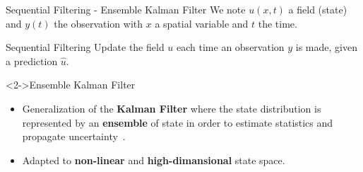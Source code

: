 \documentclass[aspectratio=169]{beamer} %
\begin{document}
\begin{frame}{Sequential Filtering - Ensemble Kalman Filter}
    \small
    We note $u(x, t)$ a field (state) and $y(t)$ the observation with $x$ a spatial variable and $t$ the time.
    \begin{block}{Sequential Filtering}
        Update the field $u$ each time an observation $y$ is made, given a prediction $\hat u$.
    \end{block}
    \vfill
    \begin{block}<2->{Ensemble Kalman Filter}
        \begin{itemize}
            \item Generalization of the \textbf{Kalman Filter} where the state distribution is represented by an \textbf{ensemble} of state in order to estimate statistics and propagate uncertainty~\cite{evensen_sequential_1994}.
            \item Adapted to \textbf{non-linear} and \textbf{high-dimansional} state space.
        \end{itemize}
    \end{block}
\end{frame}
\end{document}
